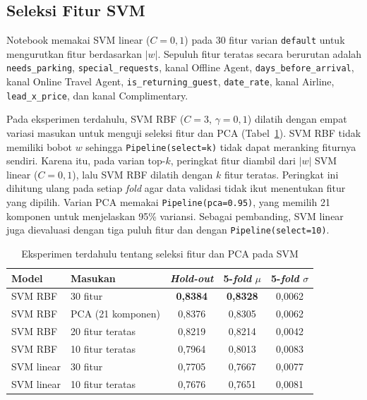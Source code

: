 \subsection{Seleksi Fitur SVM}
\label{sec:hasil-svm-seleksi}

Notebook memakai SVM linear ($C=0{,}1$) pada 30 fitur varian \texttt{default}
untuk mengurutkan fitur berdasarkan $|w|$. Sepuluh fitur teratas secara berurutan
adalah \texttt{needs\_parking}, \texttt{special\_requests}, kanal Offline Agent,
\texttt{days\_before\_arrival}, kanal Online Travel Agent,
\texttt{is\_returning\_guest}, \texttt{date\_rate}, kanal Airline,
\texttt{lead\_x\_price}, dan kanal Complimentary.

Pada eksperimen terdahulu, SVM RBF ($C=3$, $\gamma=0{,}1$) dilatih dengan
empat variasi masukan untuk menguji seleksi fitur dan PCA (Tabel~\ref{tab:seleksi}).
SVM RBF tidak memiliki bobot $w$ sehingga \texttt{Pipeline(select=k)} tidak dapat
meranking fiturnya sendiri. Karena itu, pada varian top-$k$, peringkat fitur
diambil dari $|w|$ SVM linear ($C=0{,}1$), lalu SVM RBF dilatih dengan $k$ fitur
teratas. Peringkat ini dihitung ulang pada setiap \textit{fold} agar data validasi
tidak ikut menentukan fitur yang dipilih. Varian PCA memakai
\texttt{Pipeline(pca=0.95)}, yang memilih 21 komponen untuk menjelaskan 95\%
variansi. Sebagai pembanding, SVM linear juga dievaluasi dengan tiga puluh fitur
dan dengan \texttt{Pipeline(select=10)}.

\begin{table}[H]
	\centering
	\caption{Eksperimen terdahulu tentang seleksi fitur dan PCA pada SVM}
	\label{tab:seleksi}
	\begin{tabular}{l l c c c}
		\toprule
		\textbf{Model} & \textbf{Masukan} & \textbf{\textit{Hold-out}} & \textbf{5-\textit{fold} $\mu$} & \textbf{5-\textit{fold} $\sigma$} \\
		\midrule
		SVM RBF    & 30 fitur                   & \textbf{0,8384} & \textbf{0,8328} & 0,0062 \\
		SVM RBF    & PCA (21 komponen)          & 0,8376 & 0,8305 & 0,0062 \\
		SVM RBF    & 20 fitur teratas           & 0,8219 & 0,8214 & 0,0042 \\
		SVM RBF    & 10 fitur teratas           & 0,7964 & 0,8013 & 0,0083 \\
		\midrule
		SVM linear & 30 fitur                   & 0,7705 & 0,7667 & 0,0077 \\
		SVM linear & 10 fitur teratas           & 0,7676 & 0,7651 & 0,0081 \\
		\bottomrule
	\end{tabular}
\end{table}

